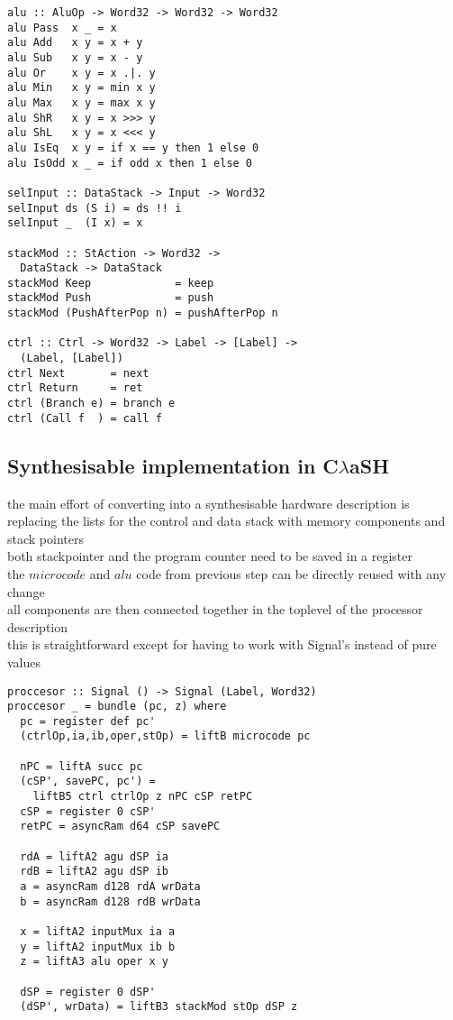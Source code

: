 \documentclass[preprint]{sigplanconf}
\def\clash{C$\lambda$aSH\xspace}
\begin{document}
\begin{lstlisting}
alu :: AluOp -> Word32 -> Word32 -> Word32
alu Pass  x _ = x
alu Add   x y = x + y
alu Sub   x y = x - y
alu Or    x y = x .|. y
alu Min   x y = min x y
alu Max   x y = max x y
alu ShR   x y = x >>> y
alu ShL   x y = x <<< y
alu IsEq  x y = if x == y then 1 else 0
alu IsOdd x _ = if odd x then 1 else 0

selInput :: DataStack -> Input -> Word32
selInput ds (S i) = ds !! i
selInput _  (I x) = x

stackMod :: StAction -> Word32 -> 
  DataStack -> DataStack
stackMod Keep             = keep
stackMod Push             = push
stackMod (PushAfterPop n) = pushAfterPop n

ctrl :: Ctrl -> Word32 -> Label -> [Label] ->
  (Label, [Label])
ctrl Next       = next
ctrl Return     = ret
ctrl (Branch e) = branch e
ctrl (Call f  ) = call f
\end{lstlisting}

\subsection{Synthesisable implementation in \clash}
the main effort of converting into a synthesisable hardware description is replacing the lists for the control and data stack with memory components and stack pointers \\
both stackpointer and the program counter need to be saved in a register \\
the $microcode$ and $alu$ code from previous step can be directly reused with any change \\
all components are then connected together in the toplevel of the processor description \\
this is straightforward except for having to work with Signal's instead of pure values

\begin{lstlisting}
proccesor :: Signal () -> Signal (Label, Word32)
proccesor _ = bundle (pc, z) where
  pc = register def pc'
  (ctrlOp,ia,ib,oper,stOp) = liftB microcode pc

  nPC = liftA succ pc
  (cSP', savePC, pc') = 
    liftB5 ctrl ctrlOp z nPC cSP retPC
  cSP = register 0 cSP'
  retPC = asyncRam d64 cSP savePC

  rdA = liftA2 agu dSP ia
  rdB = liftA2 agu dSP ib
  a = asyncRam d128 rdA wrData
  b = asyncRam d128 rdB wrData

  x = liftA2 inputMux ia a
  y = liftA2 inputMux ib b
  z = liftA3 alu oper x y

  dSP = register 0 dSP'
  (dSP', wrData) = liftB3 stackMod stOp dSP z
\end{lstlisting}
\end{document}
